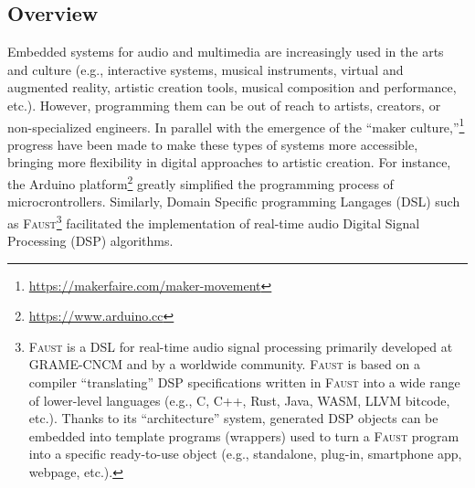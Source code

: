 \documentclass[a4paper,10pt]{article}
\newcommand{\F}{\textsc{Faust}}
\begin{document}


\subsection*{Overview}

Embedded systems for audio and multimedia are increasingly used in the arts and culture (e.g., interactive systems, musical instruments, virtual and augmented reality, artistic creation tools, musical composition and performance, etc.). However, programming them can be out of reach to artists, creators, or non-specialized engineers. In parallel with the emergence of the ``maker culture,''\footnote{\url{https://makerfaire.com/maker-movement}} progress have been made to make these types of systems more accessible, bringing more flexibility in digital approaches to artistic creation. For instance, the Arduino platform\footnote{\url{https://www.arduino.cc}} greatly simplified the programming process of microcrontrollers. Similarly, Domain Specific programming Langages (DSL) such as \F{}\footnote{\F{} is a DSL for real-time audio signal processing primarily developed at GRAME-CNCM and by a worldwide community. \F{} is based on a compiler ``translating'' DSP specifications written in \F{} into a wide range of lower-level languages (e.g., C, C++, Rust, Java, WASM, LLVM bitcode, etc.). Thanks to its ``architecture'' system, generated DSP objects can be embedded into template programs (wrappers) used to turn a \F{} program into a specific ready-to-use object (e.g., standalone, plug-in, smartphone app, webpage, etc.). } 
\cite{Orlarey2009} facilitated the implementation of real-time audio Digital Signal Processing (DSP) algorithms.
\end{document}
